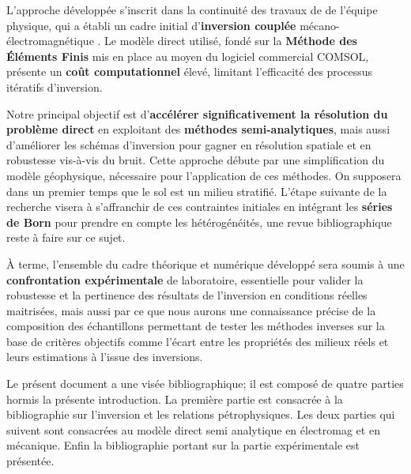 L'approche développée s'inscrit dans la continuité des travaux de de l'équipe physique, qui a établi un cadre initial d'\textbf{inversion couplée} mécano-électromagnétique \cite{didie2024}. Le modèle direct utilisé, fondé sur la \textbf{Méthode des Éléments Finis} mis en place au moyen du logiciel commercial COMSOL\textregistered, présente un \textbf{coût computationnel} élevé, limitant l'efficacité des processus itératifs d'inversion.\par 

Notre principal objectif est d'\textbf{accélérer significativement la résolution du problème direct} en exploitant des \textbf{méthodes semi-analytiques}, mais aussi d'améliorer les schémas d'inversion pour gagner en résolution spatiale et en robustesse vis-à-vis du bruit. Cette approche débute par une simplification du modèle géophysique, nécessaire pour l'application de ces méthodes. On supposera dans un premier temps que le sol est un milieu stratifié. L'étape suivante de la recherche visera à s'affranchir de ces contraintes initiales en intégrant les \textbf{séries de Born} pour prendre en compte les hétérogénéités, une revue bibliographique reste à faire sur ce sujet.

À terme, l'ensemble du cadre théorique et numérique développé sera soumis à une \textbf{confrontation expérimentale} de laboratoire, essentielle pour valider la robustesse et la pertinence des résultats de l'inversion en conditions réelles maitrisées, mais aussi par ce que nous aurons une connaissance précise de la composition des échantillons permettant de tester les méthodes inverses sur la base de critères objectifs comme l'écart entre les propriétés des milieux réels et leurs estimations à l'issue des inversions.\par 

Le présent document a une visée bibliographique; il est composé de quatre parties hormis la présente introduction. La première partie est consacrée à la bibliographie sur l'inversion et les relations pétrophysiques. Les deux parties qui suivent sont consacrées au modèle direct semi analytique en électromag et en mécanique. Enfin la bibliographie portant sur la partie expérimentale est présentée.\par 





